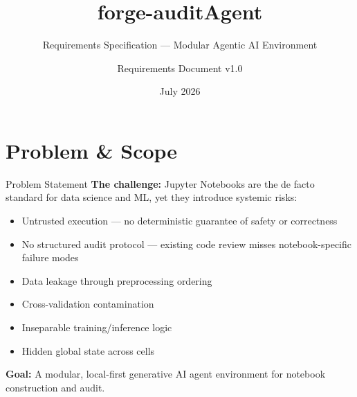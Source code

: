 \documentclass[aspectratio=169,11pt]{beamer}
\title{forge-auditAgent}
\subtitle{Requirements Specification --- Modular Agentic AI Environment}
\date{July 2026}
\author{Requirements Document v1.0}
\begin{document}
\maketitle

\section{Problem \& Scope}

\begin{frame}{Problem Statement}
  \textbf{The challenge:} Jupyter Notebooks are the de facto standard for data science and ML, yet they introduce systemic risks:

  \begin{itemize}
    \item Untrusted execution --- no deterministic guarantee of safety or correctness
    \item No structured audit protocol --- existing code review misses notebook-specific failure modes
    \item Data leakage through preprocessing ordering
    \item Cross-validation contamination
    \item Inseparable training/inference logic
    \item Hidden global state across cells
  \end{itemize}

  \vspace{0.5em}
  \textbf{Goal:} A modular, local-first generative AI agent environment for notebook construction and audit.
\end{frame}
\end{document}
